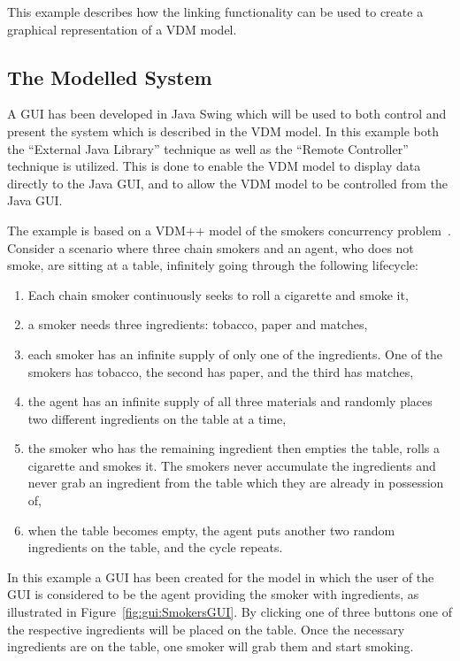 \documentclass{overturerepchap}
\begin{document}
This example describes how the linking functionality can be used to create a graphical representation of a VDM model.

\subsection{The Modelled System}
A GUI has been developed in Java Swing which will be used to both control and present the system which is described in the VDM model. In this example both the ``External Java Library'' technique as well as the ``Remote Controller'' technique is utilized. This is done to enable the VDM model to display data directly to the Java GUI, and to allow the VDM model to be controlled from the Java GUI.

The example is based on a VDM++ model of the smokers concurrency problem~\cite{Patil71}. Consider a scenario where three chain smokers and an agent, who does not smoke, are sitting at a table, infinitely going through the following lifecycle:
\begin{enumerate}
\item Each chain smoker continuously seeks to roll a cigarette and  smoke it,
\item a smoker needs three ingredients: tobacco, paper and matches,
\item each smoker has an infinite supply of only one of the ingredients.
One of the smokers has tobacco, the second has paper, and the third has
matches,
\item the agent has an infinite supply of all three materials and randomly places two different ingredients on the table at a time,
\item the smoker who has the remaining ingredient then empties the table, rolls a cigarette and smokes it. The smokers never accumulate the ingredients and never grab an ingredient from the table which they are already in possession of,
\item when the table becomes empty, the agent puts another two random ingredients on the table, and the
cycle repeats.
\end{enumerate}

In this example a GUI has been created for the model in which the user of the GUI is considered to be the agent providing the smoker with ingredients, as illustrated in Figure~\ref{fig:gui:SmokersGUI}.  By clicking one of three buttons one of the respective ingredients will be placed on the table. Once the necessary ingredients are on the table, one smoker will grab them and start smoking.
\end{document}
